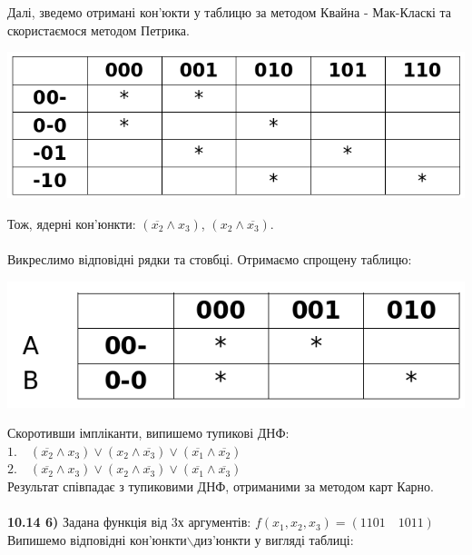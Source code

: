\documentclass[14pt,a4paper]{scrartcl}
\theoremstyle{definition}
\theoremstyle{remark}
\theoremstyle{definition}
\theoremstyle{definition}
\begin{document}
Далі, зведемо отримані кон'юкти у таблицю за методом Квайна - Мак-Класкі та скористаємося методом Петрика.\\
\begin{center}
\includegraphics[scale=0.5]{tabl1.png}
\end{center}
Тож, ядерні кон'юнкти: $(\overline{x_2} \land x_3)$, $(x_2 \land \overline{x_3})$.\\
\pagebreak\\
Викреслимо відповідні рядки та стовбці. Отримаємо спрощену таблицю:\\
\begin{center}
  \includegraphics[scale=0.5]{tabl2}
\end{center}
Скоротивши імпліканти, випишемо тупикові ДНФ:\\
$1.\quad (\overline{x_2} \land x_3)\lor (x_2 \land \overline{x_3}) \lor (\overline{x_1} \land \overline{x_2})$\\
$2.\quad (\overline{x_2} \land x_3)\lor (x_2 \land \overline{x_3}) \lor (\overline{x_1} \land \overline{x_3})$\\
Результат співпадає з тупиковими ДНФ, отриманими за методом карт Карно.\\
 \\
 \textbf{10.14 6)} Задана функція від 3х аргументів: $f(x_1, x_2, x_3) = (1101\quad 1011)$\\
 Випишемо відповідні кон'юнкти$\backslash$диз'юнкти у вигляді таблиці: \\
\end{document}
